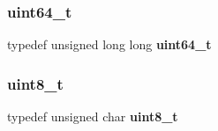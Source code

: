 \subsubsection{uint64\+\_\+t}
{\footnotesize\ttfamily typedef unsigned long long \textbf{ uint64\+\_\+t}}

\mbox{\label{_typedef_8h_aba7bc1797add20fe3efdf37ced1182c5}} 
\subsubsection{uint8\+\_\+t}
{\footnotesize\ttfamily typedef unsigned char \textbf{ uint8\+\_\+t}}

